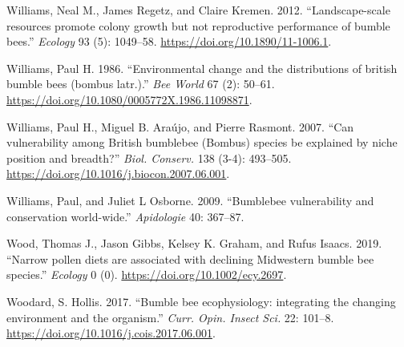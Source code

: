 \documentclass[11pt,]{article}
\begin{document}
\leavevmode\hypertarget{ref-Williams2012b}{}%
Williams, Neal M., James Regetz, and Claire Kremen. 2012.
``Landscape-scale resources promote colony growth but not reproductive
performance of bumble bees.'' \emph{Ecology} 93 (5): 1049--58.
\url{https://doi.org/10.1890/11-1006.1}.

\leavevmode\hypertarget{ref-Williams1986}{}%
Williams, Paul H. 1986. ``Environmental change and the distributions of
british bumble bees (bombus latr.).'' \emph{Bee World} 67 (2): 50--61.
\url{https://doi.org/10.1080/0005772X.1986.11098871}.

\leavevmode\hypertarget{ref-Williams2007}{}%
Williams, Paul H., Miguel B. Araújo, and Pierre Rasmont. 2007. ``Can
vulnerability among British bumblebee (Bombus) species be explained by
niche position and breadth?'' \emph{Biol. Conserv.} 138 (3-4): 493--505.
\url{https://doi.org/10.1016/j.biocon.2007.06.001}.

\leavevmode\hypertarget{ref-Williams2009}{}%
Williams, Paul, and Juliet L Osborne. 2009. ``Bumblebee vulnerability
and conservation world-wide.'' \emph{Apidologie} 40: 367--87.

\leavevmode\hypertarget{ref-Wood2019}{}%
Wood, Thomas J., Jason Gibbs, Kelsey K. Graham, and Rufus Isaacs. 2019.
``Narrow pollen diets are associated with declining Midwestern bumble
bee species.'' \emph{Ecology} 0 (0).
\url{https://doi.org/10.1002/ecy.2697}.

\leavevmode\hypertarget{ref-Woodard2017a}{}%
Woodard, S. Hollis. 2017. ``Bumble bee ecophysiology: integrating the
changing environment and the organism.'' \emph{Curr. Opin. Insect Sci.}
22: 101--8. \url{https://doi.org/10.1016/j.cois.2017.06.001}.
\end{document}
